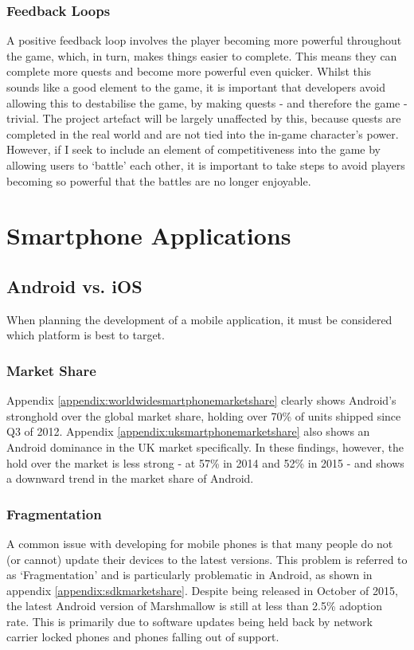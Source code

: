 \subsubsection{Feedback Loops}
A positive feedback loop involves the player becoming more powerful throughout the game, which, in turn, makes things easier to complete. This means they can complete more quests and become more powerful even quicker.
Whilst this sounds like a good element to the game, it is important that developers avoid allowing this to destabilise the game, by making quests - and therefore the game - trivial.
The project artefact will be largely unaffected by this, because quests are completed in the real world and are not tied into the in-game character's power. 
However, if I seek to include an element of competitiveness into the game by allowing users to `battle' each other, it is important to take steps to avoid players becoming so powerful that the battles are no longer enjoyable.

\section{Smartphone Applications}
\subsection{Android vs. iOS}
When planning the development of a mobile application, it must be considered which platform is best to target. 

\subsubsection{Market Share}
Appendix \ref{appendix:worldwidesmartphonemarketshare} clearly shows Android's stronghold over the global market share, holding over 70\% of units shipped since Q3 of 2012. 
Appendix \ref{appendix:uksmartphonemarketshare} also shows an Android dominance in the UK market specifically. 
In these findings, however, the hold over the market is less strong - at 57\% in 2014 and 52\% in 2015 - and shows a downward trend in the market share of Android.

\subsubsection{Fragmentation}
A common issue with developing for mobile phones is that many people do not (or cannot) update their devices to the latest versions.
This problem is referred to as `Fragmentation' and is particularly problematic in Android, as shown in appendix \ref{appendix:sdkmarketshare}.
Despite being released in October of 2015, the latest Android version of Marshmallow is still at less than 2.5\% adoption rate. 
This is primarily due to software updates being held back by network carrier locked phones and phones falling out of support.

